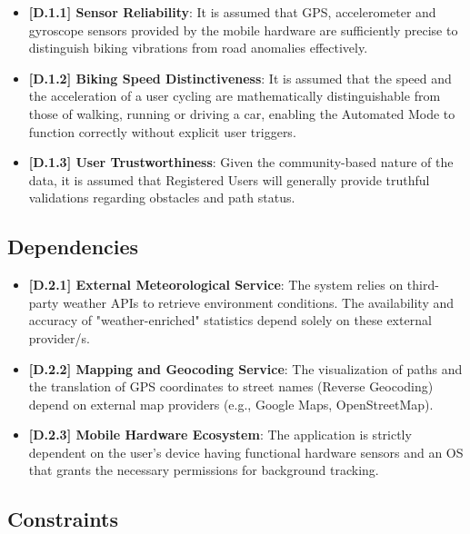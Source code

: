 \begin{itemize}
    \item \textbf{[D.1.1] Sensor Reliability}: It is assumed that GPS, accelerometer and gyroscope sensors provided by the mobile hardware are sufficiently precise to distinguish biking vibrations from road anomalies effectively.

    \item \textbf{[D.1.2] Biking Speed Distinctiveness}: It is assumed that the speed and the acceleration of a user cycling are mathematically distinguishable from those of walking, running or driving a car, enabling the Automated Mode to function correctly without explicit user triggers.

    \item \textbf{[D.1.3] User Trustworthiness}: Given the community-based nature of the data, it is assumed that Registered Users will generally provide truthful validations regarding obstacles and path status.
\end{itemize}

\subsection{Dependencies}

\begin{itemize}
    \item \textbf{[D.2.1] External Meteorological Service}: The system relies on third-party weather APIs to retrieve environment conditions. The availability and accuracy of "weather-enriched" statistics depend solely on these external provider/s.

    \item \textbf{[D.2.2] Mapping and Geocoding Service}: The visualization of paths and the translation of GPS coordinates to street names (Reverse Geocoding) depend on external map providers (e.g., Google Maps, OpenStreetMap).

    \item \textbf{[D.2.3] Mobile Hardware Ecosystem}: The application is strictly dependent on the user's device having functional hardware sensors and an OS that grants the necessary permissions for background tracking.
\end{itemize}

\subsection{Constraints}

